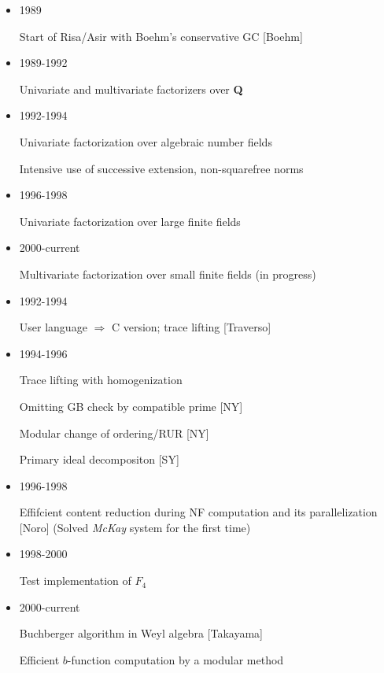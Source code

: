 \begin{slide}{}

\begin{itemize}
\item 1989

Start of Risa/Asir with Boehm's conservative GC [Boehm]

\item 1989-1992

Univariate and multivariate factorizers over {\bf Q}

\item 1992-1994

Univariate factorization over algebraic number fields

Intensive use of successive extension, non-squarefree norms

\item 1996-1998

Univariate factorization over large finite fields

\item 2000-current 

Multivariate factorization over small finite fields (in progress)
\end{itemize}
\end{slide}

\begin{slide}{}

\begin{itemize}
\item 1992-1994

User language $\Rightarrow$ C version; trace lifting [Traverso]

\item 1994-1996

Trace lifting with homogenization

Omitting GB check by compatible prime [NY]

Modular change of ordering/RUR [NY]

Primary ideal decompositon [SY]

\item 1996-1998

Effifcient content reduction during NF computation and its parallelization
[Noro] (Solved {\it McKay} system for the first time)

\item 1998-2000

Test implementation of $F_4$

\item 2000-current

Buchberger algorithm in Weyl algebra [Takayama]

Efficient $b$-function computation by a modular method
\end{itemize}
\end{slide}

